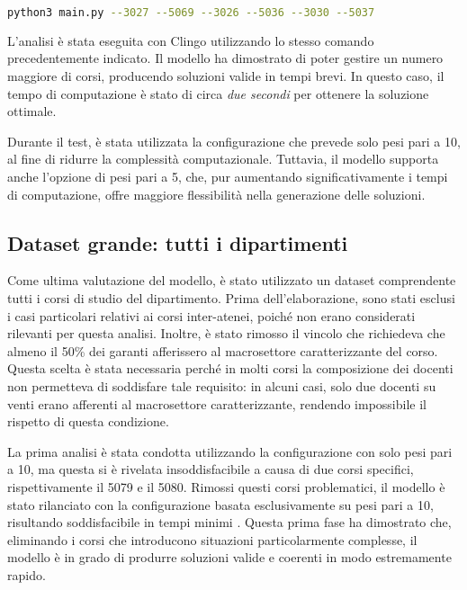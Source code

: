 \begin{lstlisting}[language=bash]
 python3 main.py --3027 --5069 --3026 --5036 --3030 --5037
\end{lstlisting}

L'analisi è stata eseguita con Clingo utilizzando lo stesso comando precedentemente 
indicato. Il modello ha dimostrato di poter gestire un numero maggiore di corsi, producendo 
soluzioni valide in tempi brevi. In questo caso, il tempo di computazione è stato di circa 
\textit{due secondi} per ottenere la soluzione ottimale.

Durante il test, è stata utilizzata la configurazione che prevede solo pesi pari a 10, al 
fine di ridurre la complessità computazionale. Tuttavia, il modello supporta anche l'opzione 
di pesi pari a 5, che, pur aumentando significativamente i tempi di computazione, offre 
maggiore flessibilità nella generazione delle soluzioni.


\subsection{Dataset grande: tutti i dipartimenti}
\label{sec:dataset-tutti-dipartimenti}

Come ultima valutazione del modello, è stato utilizzato un dataset 
comprendente tutti i corsi di studio del dipartimento. Prima dell'elaborazione, sono stati 
esclusi i casi particolari relativi ai corsi inter-atenei, poiché non erano considerati 
rilevanti per questa analisi. Inoltre, è stato rimosso il vincolo che richiedeva che almeno 
il 50\% dei garanti afferissero al macrosettore caratterizzante del corso. Questa scelta è 
stata necessaria perché in molti corsi la composizione dei docenti non permetteva di 
soddisfare tale requisito: in alcuni casi, solo due docenti su venti erano afferenti al 
macrosettore caratterizzante, rendendo impossibile il rispetto di questa condizione.

La prima analisi è stata condotta utilizzando la configurazione con solo pesi pari a 10, 
ma questa si è rivelata insoddisfacibile a causa di due corsi specifici, rispettivamente 
il 5079 e il 5080. Rimossi questi corsi problematici, il modello è stato rilanciato con 
la configurazione basata esclusivamente su pesi pari a 10, risultando soddisfacibile in 
tempi minimi . Questa prima fase ha dimostrato che, eliminando i corsi che introducono 
situazioni particolarmente complesse, il modello è in grado di produrre soluzioni valide e 
coerenti in modo estremamente rapido.

